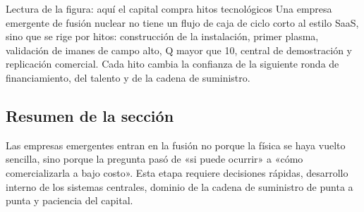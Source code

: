 \begin{knowledgebox}{Lectura de la figura: aquí el capital compra hitos tecnológicos}
Una empresa emergente de fusión nuclear no tiene un flujo de caja de ciclo corto al estilo SaaS, sino que se rige por hitos: construcción de la instalación, primer plasma, validación de imanes de campo alto, Q mayor que 10, central de demostración y replicación comercial. Cada hito cambia la confianza de la siguiente ronda de financiamiento, del talento y de la cadena de suministro.
\end{knowledgebox}

\subsection{Resumen de la sección}

Las empresas emergentes entran en la fusión no porque la física se haya vuelto sencilla, sino porque la pregunta pasó de «si puede ocurrir» a «cómo comercializarla a bajo costo». Esta etapa requiere decisiones rápidas, desarrollo interno de los sistemas centrales, dominio de la cadena de suministro de punta a punta y paciencia del capital.
